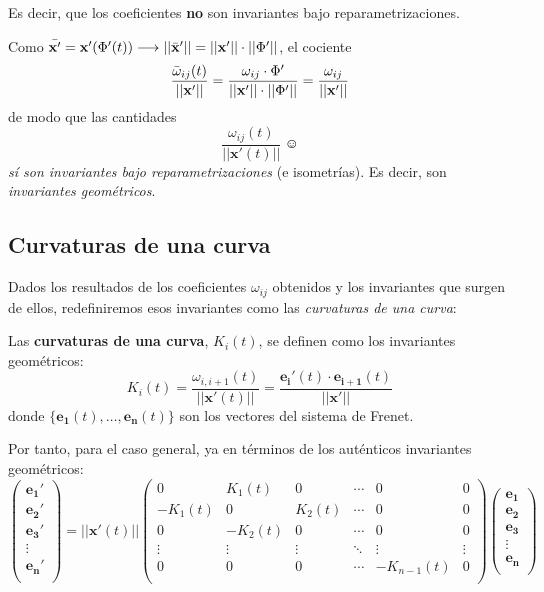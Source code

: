 \begin{enumerate}
    Es decir, que los coeficientes \textbf{no} son invariantes bajo reparametrizaciones. 
\end{enumerate}

Como $\Bar{\mathbf{x}'}=\mathbf{x'}(\Phi'(t))\longrightarrow ||\Bar{\mathbf{x}}'||=||\mathbf{x'}||\cdot ||\Phi'||$, el cociente
$$
\frac{\Bar{\omega}_{ij}(t)}{||\mathbf{x'}||}=\frac{\omega_{ij}\cdot \Phi'}{||\mathbf{x'}||\cdot ||\Phi'||}= \frac{\omega_{ij}}{||\mathbf{x'}||}
$$
de modo que las cantidades
$$
\boxed{\frac{\omega_{ij}(t)}{||\mathbf{x'}(t)||}} \ \smiley
$$
\emph{sí son invariantes bajo reparametrizaciones} (e isometrías). Es decir, son \emph{invariantes geométricos}.
\subsection{Curvaturas de una curva}
Dados los resultados de los coeficientes $\omega_{ij}$ obtenidos y los invariantes que surgen de ellos, redefiniremos esos invariantes como las \emph{curvaturas de una curva}:
\begin{mybox}
    \begin{center}
        Las \textbf{curvaturas de una curva}, $K_i(t)$, se definen como los invariantes geométricos:
        $$
        K_i(t)=\frac{\omega_{i,i+1}(t)}{||\mathbf{x'}(t)||}=\frac{\mathbf{e_i'}(t)\cdot \mathbf{e_{i+1}}(t)}{||\mathbf{x'}||}
        $$
        donde $\{ \mathbf{e_1}(t),\ldots, \mathbf{e_n}(t) \}$ son los vectores del sistema de Frenet.
    \end{center}
\end{mybox}

Por tanto, para el caso general, ya en términos de los auténticos invariantes geométricos:
$$
\left ( 
\begin{array}{c}
     \mathbf{e_1}'  \\
     \mathbf{e_2}'  \\
     \mathbf{e_3}'  \\
     \vdots     \\
     \mathbf{e_n}'  \\
\end{array}
\right )=||\mathbf{x'}(t)||\left ( 
\begin{array}{cccccc}
    0 &K_{1}(t) &0 &\cdots &0&0  \\
     -K_{1}(t) &0 &K_{2}(t) &\cdots &0&0  \\
     0 &-K_{2}(t) &0 &\cdots &0&0  \\
     \vdots &\vdots  &\vdots  &\ddots &\vdots &\vdots   \\
     0 &0 &0 &\cdots &-K_{n-1}(t)&0  \\
\end{array}
\right ) \left ( 
\begin{array}{c}
     \mathbf{e_1}  \\
     \mathbf{e_2}  \\
     \mathbf{e_3}  \\
     \vdots     \\
     \mathbf{e_n}  \\
\end{array}
\right )
$$

